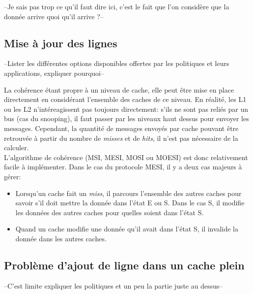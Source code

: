 --Je sais pas trop ce qu'il faut dire ici, c'est le fait que l'on considère que la donnée arrive quoi qu'il arrive ?--

\subsection{Mise à jour des lignes}

--Lister les différentes options disponibles offertes par les politiques et leurs applications, expliquer pourquoi--

La cohérence étant propre à un niveau de cache, elle peut être mise en place directement en considérant l'ensemble des caches de ce niveau. En réalité, les L1 ou les L2 n'intéreagissent pas toujours directement: s'ils ne sont pas reliés par un bus (cas du snooping), il faut passer par les niveaux haut dessus pour envoyer les messages. Cependant, la quantité de messages envoyés par cache pouvant être retrouvée à partir du nombre de \textit{misses} et de \textit{hits}, il n'est pas nécessaire de la calculer. \\

L'algorithme de cohérence (MSI, MESI, MOSI ou MOESI) est donc relativement facile à implémenter. Dans le cas du protocole MESI, il y a deux cas majeurs à gérer: \\
\begin{itemize}
\item Lorsqu'un cache fait un \textit{miss}, il parcours l'ensemble des autres caches pour savoir s'il doit mettre la donnée dans l'état E ou S. Dans le cas S, il modifie les données des autres caches pour quelles soient dans l'état S.
\item Quand un cache modifie une donnée qu'il avait dans l'état S, il invalide la donnée dans les autres caches.
\end{itemize}

\subsection{Problème d'ajout de ligne dans un cache plein}

--C'est limite expliquer les politiques et un peu la partie juste au dessus--

